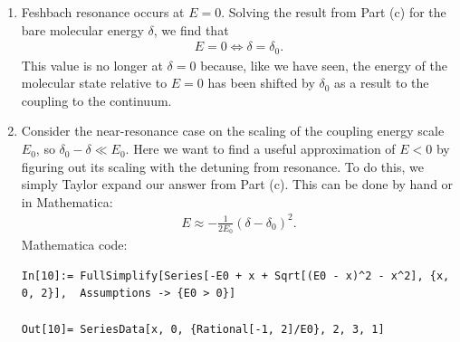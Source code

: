 \documentclass{article}
\theoremstyle{definition}
\newcommand{\f}[2]{\frac{#1}{#2}}
\begin{document}
\begin{enumerate}[label=(\alph*)]
MATLAB code for exact diagonalization and plotting
\begin{lstlisting}
clear
delta = -4:0.025:8;
dim = 8;
V = zeros(dim);
v = 0.6;
V(1:end,1) = v;
V(1,1:end) = v;
V(1,1) = 0;

energies = figure(1);
for d = delta
    H0 = diag(-1:1:dim-2);
    H0(1,1) = d;
    H = H0 + V;
    e = eig(H);
    hold on 
    plot(d*ones(dim), e, 'o', 'Color', 'red', 'MarkerSize', 2);
    plot(d,d)
end
for i=0:1:dim
    yline(i, '--', 'Color', 'black')
end
xline(0, '--', 'Color','black')
xline(6, '--', 'Color','black')
plot(delta, delta, "--",'Color', 'blue')
ylim([-4, 6])
hold off 
set(gca,'xtick', [0,6]);
xticklabels({'0','\delta_0'})
set(gca,'ytick', 0);
xlabel('Detuning \delta', 'FontSize',13)
ylabel('Two-particle energy', 'FontSize',13)
xm = [0.2 0.24];
ym = [0.3 0.25];
annotation('textarrow',xm,ym,'String','|m>')
xp = [0.5 0.5];
yp = [0.3 0.4];
annotation('textarrow',xp,yp,'String','|\phi>')
xk = [0.85 0.85];
yk = [0.65 0.75];
annotation('textarrow',xk,yk,'String','|k>')
\end{lstlisting}


\item Feshbach resonance occurs at $E=0$. Solving the result from Part (c) for the bare molecular energy $\delta$, we find that
\begin{align*}
E = 0 \iff \delta = \delta_0.
\end{align*}
This value is no longer at $\delta = 0$ because, like we have seen, the energy of the molecular state relative to $E=0$ has been shifted by $\delta_0$ as a result to the coupling to the continuum. 


\item Consider the near-resonance case on the scaling of the coupling energy scale $E_0$, so $\delta_0 - \delta \ll E_0$. Here we want to find a useful approximation of $E <0$ by figuring out its scaling with the detuning from resonance. To do this, we simply Taylor expand our answer from Part (c). This can be done by hand or in Mathematica:
\begin{align*}
 E \approx -\f{1}{2E_0}(\delta - \delta_0)^2.
\end{align*}
Mathematica code:
\begin{lstlisting}
In[10]:= FullSimplify[Series[-E0 + x + Sqrt[(E0 - x)^2 - x^2], {x, 0, 2}],  Assumptions -> {E0 > 0}]

Out[10]= SeriesData[x, 0, {Rational[-1, 2]/E0}, 2, 3, 1]
\end{lstlisting}



\end{enumerate}
\end{document}
